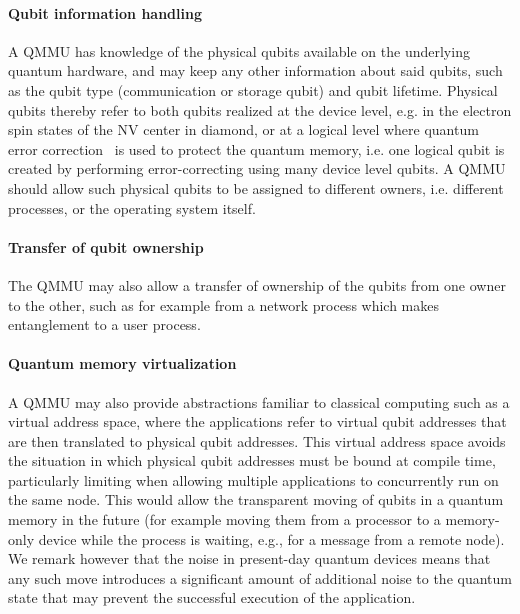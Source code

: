 \paragraph{Qubit information handling} 

A \ac{QMMU} has knowledge of the physical qubits available on the underlying quantum hardware, and may keep any other information about said qubits, such as the qubit type (communication or storage qubit) and qubit lifetime. Physical qubits thereby refer to both qubits realized at the device level, e.g. in the electron spin states of the \ac{NV} center in diamond, or at a logical level where quantum error correction~\cite{lidar2013quantum} is used to protect the quantum memory, i.e. one logical qubit is created by performing error-correcting using many device level qubits. A \ac{QMMU} should allow such physical qubits to be assigned to different owners, i.e. different processes, or the operating system itself. 

\paragraph{Transfer of qubit ownership}

The \ac{QMMU} may also allow a transfer of ownership of the qubits from one owner to the other, such as for example from a network process which makes entanglement to a user process. 

\paragraph{Quantum memory virtualization}

A \ac{QMMU} may also provide abstractions familiar to classical computing such as a virtual address space, where the applications refer to virtual qubit addresses that are then translated to physical qubit addresses. This virtual address space avoids the situation in which physical qubit addresses must be bound at compile time, particularly limiting when allowing multiple applications to concurrently run on the same node. This would allow the transparent moving of qubits in a quantum memory in the future (for example moving them from a processor to a memory-only device while the process is waiting, e.g., for a message from a remote node). We remark however that the noise in present-day quantum devices means that any such move introduces a significant amount of additional noise to the quantum state that may prevent the successful execution of the application.

